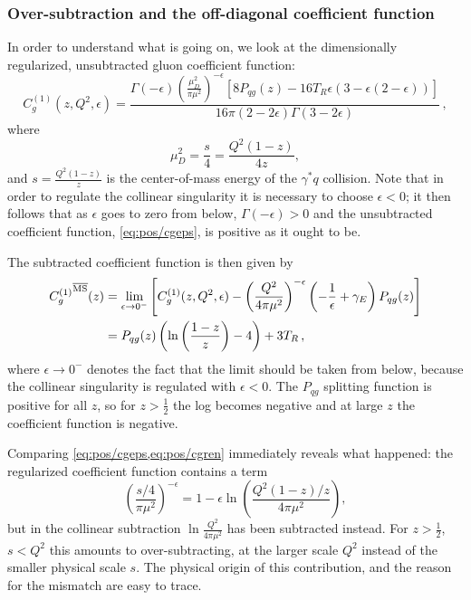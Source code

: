  
\subsubsection{Over-subtraction and the off-diagonal coefficient function}
\label{sec:pos/offdiag}

In order to understand what is going on, we look at the dimensionally
regularized, unsubtracted gluon coefficient function:
\begin{equation}\label{eq:pos/cgeps}
C^{(1)}_{g}(z,Q^2,\epsilon) = \frac{ \Gamma(-\epsilon)
  \left(\frac{\mu_D^2}{\pi\mu^2}\right)^{-\epsilon} \left[8P_{qg}(z)-16 T_R \epsilon (3
    -\epsilon(2 -\epsilon) )  \right]  }{16\pi (2 - 2\epsilon) \Gamma (3 - 2 \epsilon)}\,,
\end{equation}
where
\begin{equation}\label{eq:pos/mud}
  \mu_D^2=\frac{s}{4}=\frac{Q^2(1-z)}{4z},
\end{equation} 
and  $s=\frac{Q^2(1-z)}{z}$ is the center-of-mass energy of the
$\gamma^* q$ collision. 
Note that in order to regulate the collinear singularity it is
necessary to choose $\epsilon<0$; it then follows that  as $\epsilon$
goes to zero from below,
$\Gamma(-\epsilon)>0$ and
the unsubtracted coefficient function, \cref{eq:pos/cgeps}, is positive as it ought to
be.

The subtracted \msbar{} coefficient function is then given by
\begin{align}\label{eq:pos/cgren}
{C^{(1)}_{g}}^{{\overline{\textrm{MS}}}}(z) &= \lim_{\epsilon\to
  0^-}\left[C_{g}^{(1)}(z,Q^2,\epsilon) - \left(\frac{Q^2}{4\pi
      \mu^2}\right)^{-\epsilon} \left(-\frac 1
    {\epsilon}+\gamma_E\right) P_{qg}(z)\right]\\
    &= P_{qg}(z) \left( \ln\left(\frac{1-z}{z}\right) - 4 \right) + 3
    T_R \, ,\label{eq:pos/cgnlo}
\end{align}
where  $\epsilon\to 0^-$ denotes the fact that the limit should be
taken from below, because the collinear singularity is regulated with
$\epsilon<0$. 
The $P_{qg}$ splitting function is positive for all $z$, so for
$z>\frac{1}{2}$ the log  becomes negative and at large $z$ the
coefficient function is negative.


Comparing \cref{eq:pos/cgeps,eq:pos/cgren} immediately reveals
what happened:  the regularized coefficient function contains a term
\begin{equation}\label{eq:pos/logexp}
  \left(\frac{s/4}{\pi\mu^2}\right)^{-\epsilon}=1-\epsilon \ln \left(\frac{Q^2(1-z)/z}{4\pi\mu^2}\right),
\end{equation}
but in the collinear subtraction $\ln \frac{Q^2}{4\pi\mu^2}$ has been
subtracted instead. For $z>\frac{1}{2}$, $s<Q^2$ this
amounts to over-subtracting, at the larger scale $Q^2$ instead of the
smaller physical scale $s$. The physical origin of this contribution,
and the reason for the mismatch are easy to trace.

